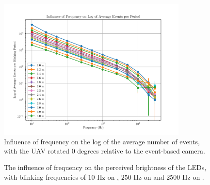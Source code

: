 \begin{figure}[H]
    \centering
    \includegraphics[width=0.85\textwidth]{./fig/semestral/freqlog.pdf}
    \caption{
        Influence of frequency on the log of the average number of events, with the UAV rotated 0 degrees relative to the event-based camera.
    }
    \label{fig:freqs}
\end{figure}

\begin{figure}[H]
    \centering
    \caption{
        The influence of frequency on the perceived brightness of the \ac{LED}s, with blinking frequencies of $10$ Hz on , $250$ Hz on  and $2500$ Hz on .
    }
\label{fig:freqs_influence}
\end{figure}

